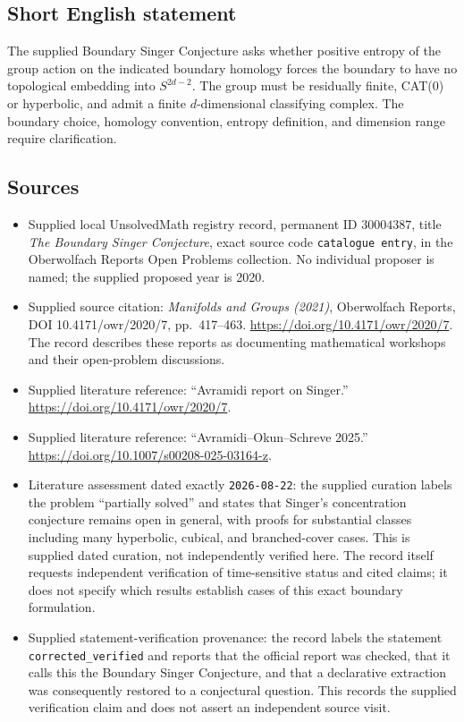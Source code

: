 \documentclass[11pt]{article}
\begin{document}
\subsection{Short English statement}
The supplied Boundary Singer Conjecture asks whether positive entropy of the group action on the indicated boundary homology forces the boundary to have no topological embedding into \(S^{2d-2}\). The group must be residually finite, CAT(0) or hyperbolic, and admit a finite \(d\)-dimensional classifying complex. The boundary choice, homology convention, entropy definition, and dimension range require clarification.
\subsection{Sources}
\begin{itemize}
\item Supplied local UnsolvedMath registry record, permanent ID \(30004387\), title \emph{The Boundary Singer Conjecture}, exact source code \texttt{catalogue entry}, in the Oberwolfach Reports Open Problems collection. No individual proposer is named; the supplied proposed year is 2020.
\item Supplied source citation: \emph{Manifolds and Groups (2021)}, Oberwolfach Reports, DOI 10.4171/owr/2020/7, pp.\ 417--463. \url{https://doi.org/10.4171/owr/2020/7}. The record describes these reports as documenting mathematical workshops and their open-problem discussions.
\item Supplied literature reference: ``Avramidi report on Singer.'' \url{https://doi.org/10.4171/owr/2020/7}.
\item Supplied literature reference: ``Avramidi--Okun--Schreve 2025.'' \url{https://doi.org/10.1007/s00208-025-03164-z}.
\item Literature assessment dated exactly \texttt{2026-08-22}: the supplied curation labels the problem ``partially solved'' and states that Singer's concentration conjecture remains open in general, with proofs for substantial classes including many hyperbolic, cubical, and branched-cover cases. This is supplied dated curation, not independently verified here. The record itself requests independent verification of time-sensitive status and cited claims; it does not specify which results establish cases of this exact boundary formulation.
\item Supplied statement-verification provenance: the record labels the statement \texttt{corrected\_verified} and reports that the official report was checked, that it calls this the Boundary Singer Conjecture, and that a declarative extraction was consequently restored to a conjectural question. This records the supplied verification claim and does not assert an independent source visit.
\end{itemize}
\end{document}
